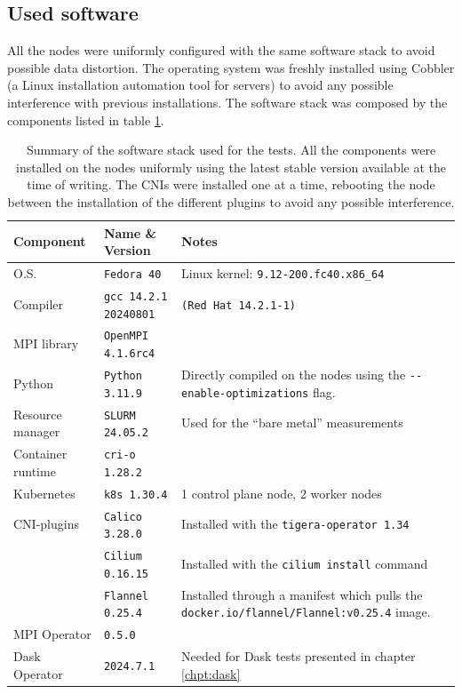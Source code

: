 \subsection{Used software}

All the nodes were uniformly configured with the same software stack to avoid
possible data distortion. The operating system was freshly installed using
Cobbler (a Linux installation automation tool for servers) to avoid any possible
interference with previous installations.
The software stack was composed by the components listed in table
\ref{tab:softwarestack}.

\begin{table}[H]
  \centering
  \begin{tabularx}{\linewidth}{p{}p{}X}  %
    \toprule
    \textbf{Component} & \textbf{Name \& Version} & \textbf{Notes} \\
    \midrule
    O.S.              & \texttt{Fedora 40}           & Linux kernel: \texttt{9.12-200.fc40.x86\_64} \\
    Compiler          & \texttt{gcc 14.2.1 20240801} & \texttt{(Red Hat 14.2.1-1)}   \\
    MPI library       & \texttt{OpenMPI 4.1.6rc4}    &  \\
    Python            & \texttt{Python 3.11.9}       & Directly compiled on the nodes using the \newline \texttt{-}\texttt{-enable-optimizations} flag. \\
    Resource manager  & \texttt{SLURM 24.05.2}       & Used for the ``bare metal'' measurements \\
    Container runtime & \texttt{cri-o 1.28.2}        &  \\
    Kubernetes        & \texttt{k8s 1.30.4}          &  1 control plane node, 2 worker nodes\\
    CNI-plugins       & \texttt{Calico 3.28.0}       & Installed with the \texttt{tigera-operator 1.34} \\
    \                 & \texttt{Cilium 0.16.15}      & Installed with the \texttt{cilium install} command \\
                      & \texttt{Flannel 0.25.4}      & Installed through a manifest which pulls the \texttt{docker.io/flannel/Flannel:v0.25.4} image. \\
    MPI Operator      & \texttt{0.5.0}               &  \\
    Dask Operator     & \texttt{2024.7.1}            & Needed for Dask tests presented in chapter \ref{chpt:dask} \\
   \bottomrule
  \end{tabularx}
  \caption{Summary of the software stack used for the tests. All the components
    were installed on the nodes uniformly using the latest stable version
    available at the time of writing. The CNIs were installed one at a time,
    rebooting the node between the installation of the different plugins to
    avoid any possible interference.}
  \label{tab:softwarestack}
\end{table}

